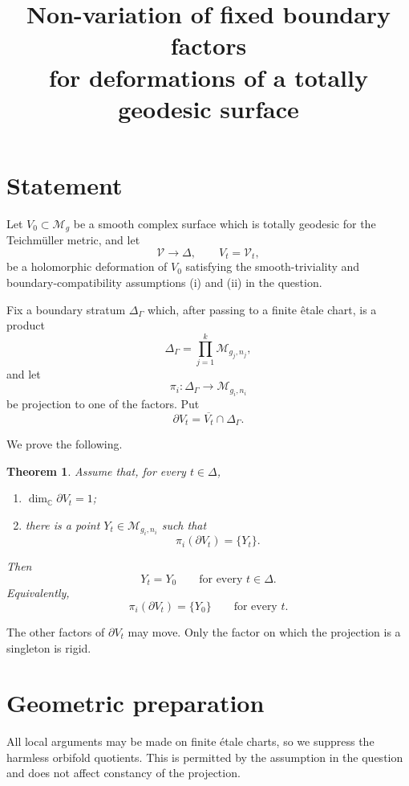 \documentclass[11pt]{amsart}
\newtheorem{theorem}{Theorem}[section]
\theoremstyle{definition}
\theoremstyle{remark}
\newcommand{\M}{\mathcal M}
\newcommand{\C}{\mathbb C}
\newcommand{\DD}{\Delta}
\newcommand{\cV}{\mathcal V}
\begin{document}
\title{Non-variation of fixed boundary factors\\
for deformations of a totally geodesic surface}
\date{}
\maketitle

\section{Statement}

Let \(V_{0}\subset \M_g\) be a smooth complex surface which is totally
geodesic for the Teichm\"uller metric, and let
\[
\cV\longrightarrow \DD,\qquad V_t=\cV_t,
\]
be a holomorphic deformation of \(V_0\) satisfying the smooth-triviality
and boundary-compatibility assumptions (i) and (ii) in the question.

Fix a boundary stratum \(\Delta_\Gamma\) which, after passing to a finite
\^etale chart, is a product
\[
\Delta_\Gamma
   =\prod_{j=1}^{k}\M_{g_j,n_j},
\]
and let
\[
\pi_i:\Delta_\Gamma\longrightarrow \M_{g_i,n_i}
\]
be projection to one of the factors. Put
\[
\partial V_t=\overline{V_t}\cap \Delta_\Gamma .
\]

We prove the following.

\begin{theorem}\label{thm:main}
Assume that, for every \(t\in\DD\),
\begin{enumerate}[label=\textup{(\alph*)}]
\item \(\dim_\C\partial V_t=1\);
\item there is a point \(Y_t\in\M_{g_i,n_i}\) such that
\[
\pi_i(\partial V_t)=\{Y_t\}.
\]
\end{enumerate}
Then
\[
Y_t=Y_0\qquad\text{for every }t\in\DD.
\]
Equivalently,
\[
\pi_i(\partial V_t)=\{Y_0\}
\qquad\text{for every }t.
\]
\end{theorem}

The other factors of \(\partial V_t\) may move. Only the factor on which
the projection is a singleton is rigid.

\section{Geometric preparation}

All local arguments may be made on finite \'etale charts, so we suppress
the harmless orbifold quotients. This is permitted by the assumption in
the question and does not affect constancy of the projection.
\end{document}
